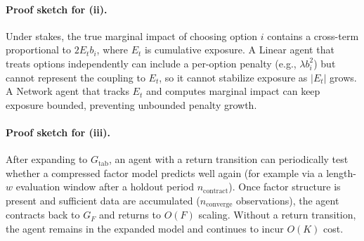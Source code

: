 \paragraph{Proof sketch for (ii).}
Under stakes, the true marginal impact of choosing option $i$ contains a
cross-term proportional to $2E_t b_i$, where $E_t$ is cumulative exposure.  A
Linear agent that treats options independently can include a per-option penalty
(e.g., $\lambda b_i^2$) but cannot represent the coupling to $E_t$, so it cannot
stabilize exposure as $|E_t|$ grows.  A Network agent that tracks $E_t$ and
computes marginal impact can keep exposure bounded, preventing unbounded penalty
growth.

\paragraph{Proof sketch for (iii).}
After expanding to $G_{\mathrm{tab}}$, an agent with a return transition can
periodically test whether a compressed factor model predicts well again (for
example via a length-$w$ evaluation window after a holdout period
$n_{\mathrm{contract}}$).  Once factor structure is present and sufficient data
are accumulated ($n_{\mathrm{converge}}$ observations), the agent contracts back
to $G_F$ and returns to $O(F)$ scaling.  Without a return transition, the agent
remains in the expanded model and continues to incur $O(K)$ cost.

